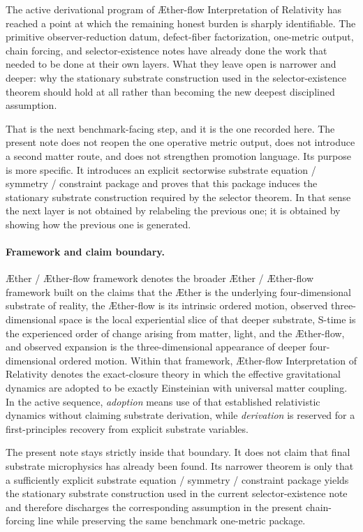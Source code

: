 \documentclass[11pt]{article}
\newcommand{\Aether}{\AE{}ther}
\newcommand{\Aflow}{\AE{}ther-flow}
\newcommand{\TheoryName}{\Aflow{} Interpretation of Relativity}
\newcommand{\TheoryProgram}{\Aether{} / \Aflow{} framework}
\begin{document}
The active derivational program of \TheoryName{} has reached a point at which the remaining honest burden is sharply identifiable. The primitive observer-reduction datum, defect-fiber factorization, one-metric output, chain forcing, and selector-existence notes have already done the work that needed to be done at their own layers. What they leave open is narrower and deeper: why the stationary substrate construction used in the selector-existence theorem should hold at all rather than becoming the new deepest disciplined assumption.

That is the next benchmark-facing step, and it is the one recorded here. The present note does not reopen the one operative metric output, does not introduce a second matter route, and does not strengthen promotion language. Its purpose is more specific. It introduces an explicit sectorwise substrate equation / symmetry / constraint package and proves that this package induces the stationary substrate construction required by the selector theorem. In that sense the next layer is not obtained by relabeling the previous one; it is obtained by showing how the previous one is generated.

\paragraph{Framework and claim boundary.}
\TheoryProgram{} denotes the broader \Aether{} / \Aflow{} framework built on the claims that the \Aether{} is the underlying four-dimensional substrate of reality, the \Aflow{} is its intrinsic ordered motion, observed three-dimensional space is the local experiential slice of that deeper substrate, S-time is the experienced order of change arising from matter, light, and the \Aflow{}, and observed expansion is the three-dimensional appearance of deeper four-dimensional ordered motion. Within that framework, \TheoryName{} denotes the exact-closure theory in which the effective gravitational dynamics are adopted to be exactly Einsteinian with universal matter coupling. In the active sequence, \emph{adoption} means use of that established relativistic dynamics without claiming substrate derivation, while \emph{derivation} is reserved for a first-principles recovery from explicit substrate variables.

The present note stays strictly inside that boundary. It does not claim that final substrate microphysics has already been found. Its narrower theorem is only that a sufficiently explicit substrate equation / symmetry / constraint package yields the stationary substrate construction used in the current selector-existence note and therefore discharges the corresponding assumption in the present chain-forcing line while preserving the same benchmark one-metric package.
\end{document}
